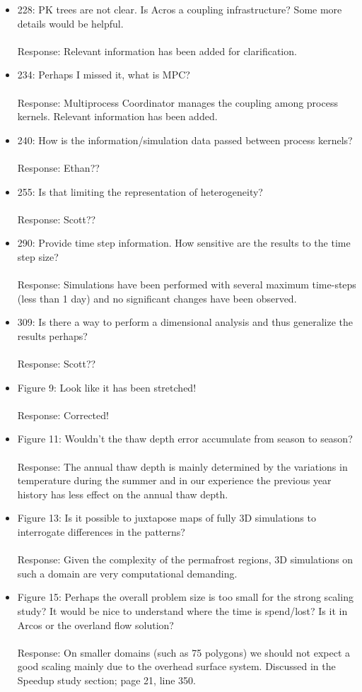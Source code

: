 \documentclass[12pt]{article}\usepackage{amsmath, amssymb, graphicx, array}
\begin{document}
\begin{itemize}

\item 228: PK trees are not clear. Is Acros a coupling infrastructure? Some more details would be helpful. \\ \\
Response: Relevant information has been added for clarification.
\item 234: Perhaps I missed it, what is MPC? \\ \\ 
Response: Multiprocess Coordinator manages the coupling among process kernels. Relevant information has been added.
\item 240: How is the information/simulation data passed between process kernels? \\ \\
Response:  Ethan??
\item 255: Is that limiting the representation of heterogeneity? \\ \\
Response: Scott??
\item 290: Provide time step information. How sensitive are the results to the time step size? \\ \\
Response:  Simulations have been performed with several maximum time-steps (less than 1 day) and no significant changes have been observed.
\item 309: Is there a way to perform a dimensional analysis and thus generalize the results perhaps? \\ \\
Response: Scott??
\item Figure 9: Look like it has been stretched! \\ \\
Response: Corrected!
\item Figure 11: Wouldn't the thaw depth error accumulate from season to season? \\ \\
Response: The annual thaw depth is mainly determined by the variations in temperature during the summer and in our experience the previous year history has less effect on the annual thaw depth. 
\item Figure 13: Is it possible to juxtapose maps of fully 3D simulations to interrogate differences in the patterns? \\ \\
Response: Given the complexity of the permafrost regions, 3D simulations on such a domain are very computational demanding.
\item Figure 15: Perhaps the overall problem size is too small for the strong scaling study? It would be nice to understand where the time is spend/lost? Is it in Arcos or the overland flow solution? \\ \\ 
Response: On smaller domains (such as 75 polygons) we should not expect a good scaling mainly due to the overhead surface system. Discussed in the Speedup study section; page 21, line 350.


\end{itemize}
\end{document}
